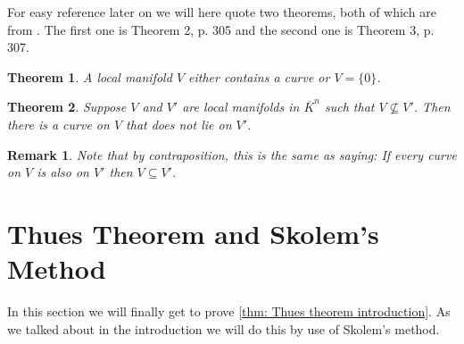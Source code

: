 \documentclass{article}
\newtheorem{theorem}{Theorem}[section]
\newtheorem{lemma}{Lemma}[section]
\newtheorem{remark}{Remark}[section]
\numberwithin{equation}{section}
\begin{document}
% 


For easy reference later on we will here quote two theorems, both of which are from \citep{borevich}. The first one is Theorem 2, p. 305 and the second one is Theorem 3, p. 307. 

\begin{theorem}\label{thm: The shape of a manifold}
    A local manifold $V$ either contains a curve or $V = \{ 0 \}$.
\end{theorem}
\begin{theorem}\label{thm: One manifold is contained in another}
    Suppose $V$ and $V'$ are local manifolds in $\overline K^n$ such that $V \nsubseteq V'$. Then there is a curve on $V$ that does not lie on $V'$.
\end{theorem}
\begin{remark}\label{remark: One manifold is contained in another}
    Note that by contraposition, this is the same as saying: If every curve on $V$ is also on $V'$ then $V \subseteq V'$.
\end{remark}

\section{Thues Theorem and Skolem's Method}\label{section: skolem and thue}
In this section we will finally get to prove \cref{thm: Thues theorem introduction}. As we talked about in the introduction we will do this by use of Skolem's method.
\end{document}

